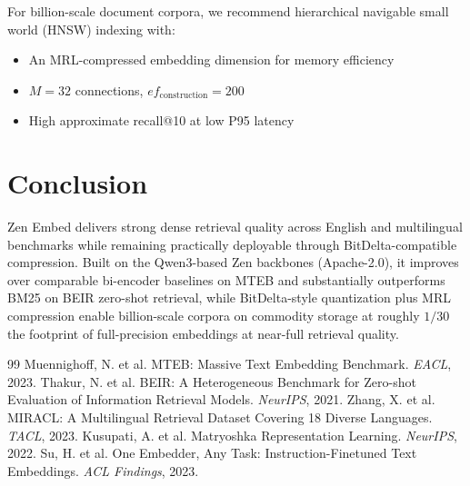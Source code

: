 \documentclass[11pt,a4paper]{article}
\begin{document}
For billion-scale document corpora, we recommend hierarchical navigable small world (HNSW) indexing with:
\begin{itemize}
  \item An MRL-compressed embedding dimension for memory efficiency
  \item $M=32$ connections, $ef_\text{construction}=200$
  \item High approximate recall@10 at low P95 latency
\end{itemize}

\section{Conclusion}

Zen Embed delivers strong dense retrieval quality across English and multilingual benchmarks while remaining practically deployable through BitDelta-compatible compression. Built on the Qwen3-based Zen backbones (Apache-2.0), it improves over comparable bi-encoder baselines on MTEB and substantially outperforms BM25 on BEIR zero-shot retrieval, while BitDelta-style quantization plus MRL compression enable billion-scale corpora on commodity storage at roughly $1/30$ the footprint of full-precision embeddings at near-full retrieval quality.

\begin{thebibliography}{99}
 Muennighoff, N. et al. MTEB: Massive Text Embedding Benchmark. \textit{EACL}, 2023.
 Thakur, N. et al. BEIR: A Heterogeneous Benchmark for Zero-shot Evaluation of Information Retrieval Models. \textit{NeurIPS}, 2021.
 Zhang, X. et al. MIRACL: A Multilingual Retrieval Dataset Covering 18 Diverse Languages. \textit{TACL}, 2023.
 Kusupati, A. et al. Matryoshka Representation Learning. \textit{NeurIPS}, 2022.
 Su, H. et al. One Embedder, Any Task: Instruction-Finetuned Text Embeddings. \textit{ACL Findings}, 2023.
\end{thebibliography}
\end{document}
